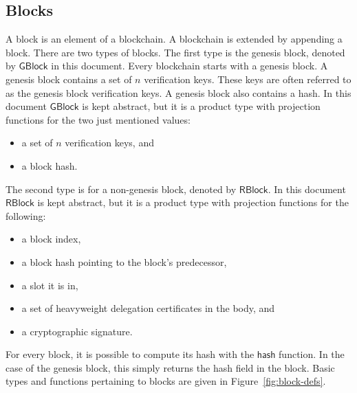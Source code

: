 \documentclass[11pt,a4paper]{article}
\newcommand{\fun}[1]{\mathsf{#1}}
\newcommand{\type}[1]{\mathsf{#1}}
\newcommand{\GBlock}{\type{GBlock}}
\newcommand{\RBlock}{\type{RBlock}}
\newcommand{\hashofblockname}{hash}
\begin{document}
\subsection{Blocks}
\label{sec:blocks}

A block is an element of a blockchain.
%
A blockchain is extended by appending a block.
%
There are two types of blocks.
%
The first type is the genesis block, denoted by $\GBlock$ in this document.
%
Every blockchain starts with a genesis block.
%
A genesis block contains a set of $n$ verification keys.
%
These keys are often referred to as the genesis block verification keys.
%
A genesis block also contains a hash.
%
In this document $\GBlock$ is kept abstract, but it is a product type with
projection functions for the two just mentioned values:
%
\begin{itemize}
\item a set of $n$ verification keys, and
\item a block hash.
\end{itemize}

The second type is for a non-genesis block, denoted by $\RBlock$.
%
In this document $\RBlock$ is kept abstract, but it is a product type with
projection functions for the following:
%
\begin{itemize}
\item a block index,
\item a block hash pointing to the block's predecessor,
\item a slot it is in,
\item a set of heavyweight delegation certificates in the body, and
\item a cryptographic signature.
\end{itemize}


%
For every block, it is possible to compute its hash with the
$\fun{\hashofblockname}$ function.
%
In the case of the genesis block, this simply returns the hash field in the
block.
%
Basic types and functions pertaining to blocks are given in
Figure~\ref{fig:block-defs}.
\end{document}
